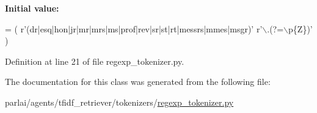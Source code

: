 {\bfseries Initial value\+:}
\begin{DoxyCode}
=  (
        \textcolor{stringliteral}{r'(dr|esq|hon|jr|mr|mrs|ms|prof|rev|sr|st|rt|messrs|mmes|msgr)'} \textcolor{stringliteral}{r'\(\backslash\).(?=\(\backslash\)p\{Z\})'}
    )
\end{DoxyCode}


Definition at line 21 of file regexp\+\_\+tokenizer.\+py.



The documentation for this class was generated from the following file\+:\begin{DoxyCompactItemize}
\item 
parlai/agents/tfidf\+\_\+retriever/tokenizers/\hyperlink{regexp__tokenizer_8py}{regexp\+\_\+tokenizer.\+py}\end{DoxyCompactItemize}

